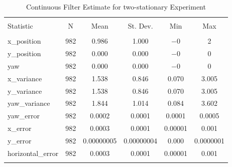 
\begin{table}[h] \centering 
  \caption{Continuous Filter Estimate for two-stationary Experiment} 
  \label{tab:two_stationary_continuous_summary} 
\begin{tabular}{@{\extracolsep{5pt}}lccccc} 
\\[-1.8ex]\hline 
\hline \\[-1.8ex] 
Statistic & \multicolumn{1}{c}{N} & \multicolumn{1}{c}{Mean} & \multicolumn{1}{c}{St. Dev.} & \multicolumn{1}{c}{Min} & \multicolumn{1}{c}{Max} \\ 
\hline \\[-1.8ex] 
x\_position & 982 & 0.986 & 1.000 & $-$0 & 2 \\ 
y\_position & 982 & 0.000 & 0.000 & $-$0 & 0 \\ 
yaw & 982 & 0.000 & 0.000 & $-$0 & 0 \\ 
x\_variance & 982 & 1.538 & 0.846 & 0.070 & 3.005 \\ 
y\_variance & 982 & 1.538 & 0.846 & 0.070 & 3.005 \\ 
yaw\_variance & 982 & 1.844 & 1.014 & 0.084 & 3.602 \\ 
yaw\_error & 982 & 0.0002 & 0.0001 & 0.0001 & 0.0005 \\ 
x\_error & 982 & 0.0003 & 0.0001 & 0.00001 & 0.001 \\ 
y\_error & 982 & 0.00000005 & 0.00000004 & 0.000 & 0.0000001 \\ 
horizontal\_error & 982 & 0.0003 & 0.0001 & 0.00001 & 0.001 \\ 
\hline \\[-1.8ex] 
\end{tabular} 
\end{table} 
